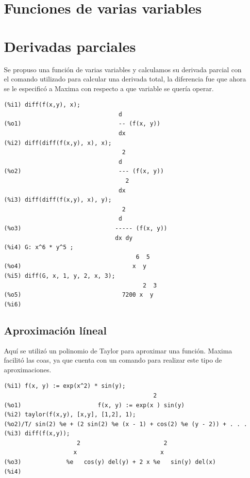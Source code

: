 \documentclass[12pt,letterpaper]{article}
\begin{document}
\section{Funciones de varias variables}

\section*{Derivadas parciales}
Se propuso una función  de varias variables y calculamos su derivada parcial con el comando utilizado para calcular una derivada total, la diferencia fue que ahora se le especificó a Maxima con respecto a que variable se quería operar.

\begin{verbatim}
(%i1) diff(f(x,y), x);
                                 d
(%o1)                            -- (f(x, y))
                                 dx
(%i2) diff(diff(f(x,y), x), x);
                                  2
                                 d
(%o2)                            --- (f(x, y))
                                   2
                                 dx
(%i3) diff(diff(f(x,y), x), y);
                                  2
                                 d
(%o3)                           ----- (f(x, y))
                                dx dy
(%i4) G: x^6 * y^5 ;
                                      6  5
(%o4)                                x  y
(%i5) diff(G, x, 1, y, 2, x, 3);
                                        2  3
(%o5)                             7200 x  y
(%i6) 
\end{verbatim}

\subsection{Aproximación líneal}
Aquí se utilizó un polinomio de Taylor para aproximar una función. Maxima facilitó las coas, ya que cuenta con un comando para realizar este tipo de aproximaciones.

\begin{verbatim}
(%i1) f(x, y) := exp(x^2) * sin(y);
                                           2
(%o1)                      f(x, y) := exp(x ) sin(y)
(%i2) taylor(f(x,y), [x,y], [1,2], 1);
(%o2)/T/ sin(2) %e + (2 sin(2) %e (x - 1) + cos(2) %e (y - 2)) + . . .
(%i3) diff(f(x,y));
                     2                        2
                    x                        x
(%o3)             %e   cos(y) del(y) + 2 x %e   sin(y) del(x)
(%i4) 
\end{verbatim}
\end{document}
